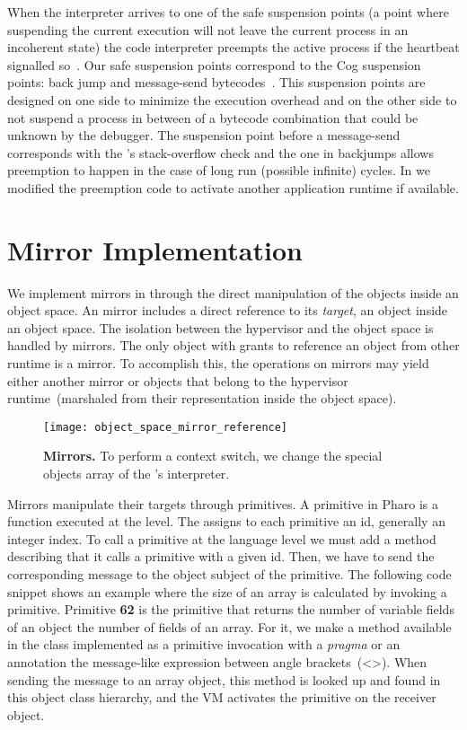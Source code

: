 When the \VM interpreter arrives to one of the safe suspension points (\ie a point where suspending the current execution will not leave the current process in an incoherent state) the code interpreter preempts the active process if the heartbeat signalled so~\cite{Deut84a}. Our safe suspension points correspond to the Cog \VM suspension points: back jump and message-send bytecodes~\cite{Mira11a}. This suspension points are designed on one side to minimize the execution overhead and on the other side to not suspend a process in between of a bytecode combination that could be unknown by the debugger. The suspension point before a message-send corresponds with the \VM's stack-overflow check and the one in backjumps allows preemption to happen in the case of long run (possible infinite) cycles. In \Vtt we modified the preemption code to activate another application runtime if available.

\section{\Vtt Mirror Implementation}\label{sec:implementation_mirrors}

We implement mirrors in \Vtt through the direct manipulation of the objects inside an object space. An \Vtt mirror includes a direct reference to its \emph{target}, an object inside an object space. The isolation between the hypervisor and the object space is handled by mirrors. The only object with grants to reference an object from other runtime is a mirror. To accomplish this, the operations on mirrors may yield either another mirror or objects that belong to the hypervisor runtime~(marshaled from their representation inside the object space).

\begin{figure}[htb]
\begin{center}
\texttt{[image: object\_space\_mirror\_reference]}
\caption{\textbf{Mirrors.} To perform a context switch, we change the special objects array of the \VM's interpreter.\label{fig:mirror_reference}}
\end{center}
\end{figure}

Mirrors manipulate their targets through \VM primitives. A primitive in Pharo is a function executed at the \VM level. The \VM assigns to each primitive an id, generally an integer index. To call a primitive at the language level we must add a method describing that it calls a primitive with a given id. Then, we have to send the corresponding message to the object subject of the primitive. The following code snippet shows an example where the size of an array is calculated by invoking a primitive. Primitive \textbf{62} is the primitive that returns the number of variable fields of an object \eg the number of fields of an array. For it, we make a method  available in the  class implemented as a primitive invocation with a \emph{pragma} or an annotation \ie the message-like expression between angle brackets~(<>). When sending the message  to an array object, this method is looked up and found in this object class hierarchy, and the VM activates the primitive on the receiver object.

